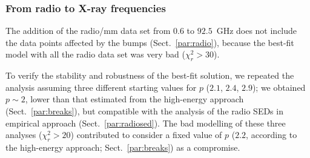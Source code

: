 \documentclass{aa}
\begin{document}
\subsubsection{From radio to X-ray frequencies}
\label{par:tutto_res}

The addition of the radio/mm data set from $0.6$ to $92.5$~GHz does not include the data points affected by the bumps (Sect.~\ref{par:radio}), because the best-fit model with all the radio data set was very bad ($\chi^2_r > 30$).

To verify the stability and robustness of the best-fit solution, we repeated the analysis assuming three different starting values for $p$ ($2.1$, $2.4$, $2.9$); we obtained $p \sim 2$, lower than that estimated from the high-energy approach (Sect.~\ref{par:breaks}), but compatible with the analysis of the radio SEDs in empirical approach (Sect.~\ref{par:radiosed}).
The bad modelling of these three analyses ($\chi^2_r > 20$) contributed to consider a fixed value of $p$ ($2.2$, according to the high-energy approach; Sect.~\ref{par:breaks}) as a compromise.
\end{document}

